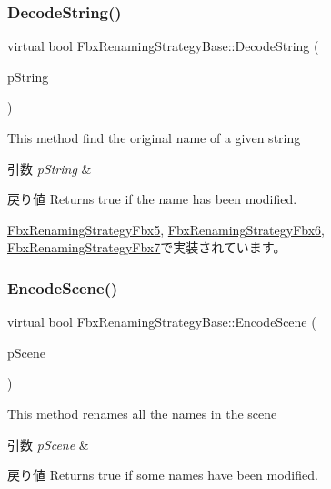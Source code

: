 \subsubsection{\texorpdfstring{Decode\+String()}{DecodeString()}}
{\footnotesize\ttfamily virtual bool Fbx\+Renaming\+Strategy\+Base\+::\+Decode\+String (\begin{DoxyParamCaption}\item[{\hyperlink{class_fbx_name_handler}{Fbx\+Name\+Handler} \&}]{p\+String }\end{DoxyParamCaption})\hspace{0.3cm}{\ttfamily [pure virtual]}}

This method find the original name of a given string 
\begin{DoxyParams}{引数}
{\em p\+String} & \\
\hline
\end{DoxyParams}
\begin{DoxyReturn}{戻り値}
Returns true if the name has been modified. 
\end{DoxyReturn}


\hyperlink{class_fbx_renaming_strategy_fbx5_a10862b9d829203cdb2810c2f42c844ee}{Fbx\+Renaming\+Strategy\+Fbx5}, \hyperlink{class_fbx_renaming_strategy_fbx6_a491fb1e1fe7f2d194059f83f49be9e19}{Fbx\+Renaming\+Strategy\+Fbx6}, \hyperlink{class_fbx_renaming_strategy_fbx7_a9f8f8714746bdc9904c31741e0b595f6}{Fbx\+Renaming\+Strategy\+Fbx7}で実装されています。

\mbox{\label{class_fbx_renaming_strategy_base_a7449fa6c649949d6d5e3c4b7190d6b25}} 
\subsubsection{\texorpdfstring{Encode\+Scene()}{EncodeScene()}}
{\footnotesize\ttfamily virtual bool Fbx\+Renaming\+Strategy\+Base\+::\+Encode\+Scene (\begin{DoxyParamCaption}\item[{\hyperlink{class_fbx_scene}{Fbx\+Scene} $\ast$}]{p\+Scene }\end{DoxyParamCaption})\hspace{0.3cm}{\ttfamily [pure virtual]}}

This method renames all the names in the scene 
\begin{DoxyParams}{引数}
{\em p\+Scene} & \\
\hline
\end{DoxyParams}
\begin{DoxyReturn}{戻り値}
Returns true if some names have been modified. 
\end{DoxyReturn}


